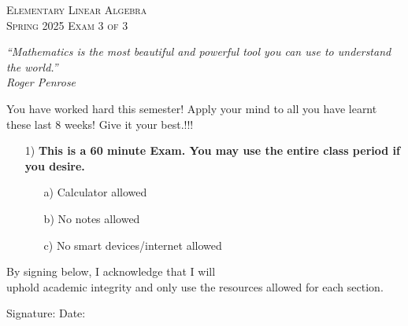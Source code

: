 \documentclass[12pt]{article}%
\begin{document}
\newcommand{\HRule}{\rule{\linewidth}{0.5mm}}

\begin{minipage}{0.8\textwidth}
\begin{flushright}
\centering
\textsc{\small Elementary Linear Algebra}\\[0.1cm] 
\textsc{\small Spring 2025 Exam 3 of 3
}\\[0.1cm] 
\end{flushright}
\end{minipage}

\vspace{1cm}
\begin{center}
    \textit{“Mathematics is the most beautiful and powerful tool you can use to understand the world.”}
\\
\textit{Roger Penrose}

\end{center}

\begin{center}
    You have worked hard this semester! Apply your mind to all you have learnt these last 8 weeks! Give it your best.!!!
\end{center}
\vspace{2cm}
\begin{enumerate}
    \item[1)] \textbf{This is a 60 minute Exam. You may use the entire class period if you desire.}
    \begin{itemize}
        \item[a)] Calculator allowed

        \item[b)] No notes allowed
        
        \item[c)] No smart devices/internet allowed
    \end{itemize}
    
\end{enumerate}
\vspace{1cm}
By signing below, I \hrulefill \hspace{0.2cm} acknowledge that I will\\
uphold academic integrity and only use the resources allowed for each section.

\vspace{1cm}
Signature:\hrulefill \hspace{2cm} Date:\hrulefill

\vspace{0.5cm}
\end{document}
